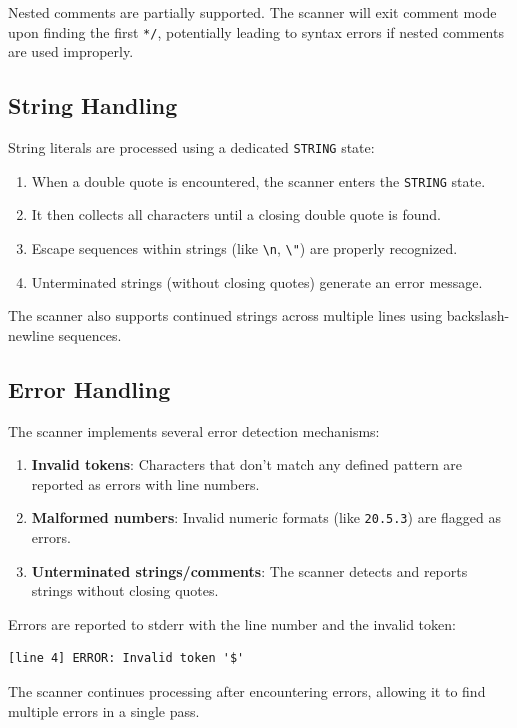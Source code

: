 \documentclass[12pt]{article}
\begin{document}
Nested comments are partially supported. The scanner will exit comment mode upon finding the first \texttt{*/}, potentially leading to syntax errors if nested comments are used improperly.

\subsection{String Handling}

String literals are processed using a dedicated \texttt{STRING} state:
\begin{enumerate}
    \item When a double quote is encountered, the scanner enters the \texttt{STRING} state.
    \item It then collects all characters until a closing double quote is found.
    \item Escape sequences within strings (like \texttt{\textbackslash n}, \texttt{\textbackslash"}) are properly recognized.
    \item Unterminated strings (without closing quotes) generate an error message.
\end{enumerate}

The scanner also supports continued strings across multiple lines using backslash-newline sequences.

\subsection{Error Handling}

The scanner implements several error detection mechanisms:
\begin{enumerate}
    \item \textbf{Invalid tokens}: Characters that don't match any defined pattern are reported as errors with line numbers.
    \item \textbf{Malformed numbers}: Invalid numeric formats (like \texttt{20.5.3}) are flagged as errors.
    \item \textbf{Unterminated strings/comments}: The scanner detects and reports strings without closing quotes.
\end{enumerate}

Errors are reported to stderr with the line number and the invalid token:
\begin{verbatim}
[line 4] ERROR: Invalid token '$'
\end{verbatim}

The scanner continues processing after encountering errors, allowing it to find multiple errors in a single pass.
\end{document}
